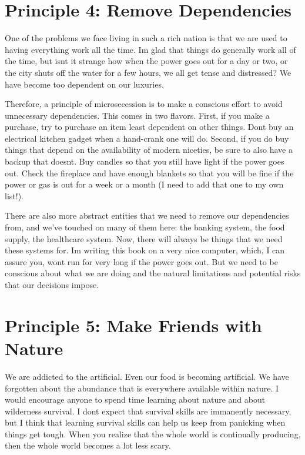 \section{Principle 4: Remove
Dependencies}

One of the problems we face living in such a rich nation is that we are
used to having everything work all the time. I{\textquotesingle}m glad
that things do generally work all of the time, but
isn{\textquotesingle}t it strange how when the power goes out for a day
or two, or the city shuts off the water for a few hours, we all get
tense and distressed? We have become too dependent on our luxuries.


Therefore, a principle of microsecession is to make a conscious effort
to avoid unnecessary dependencies. This comes in two flavors. First, if
you make a purchase, try to purchase an item least dependent on other
things. Don{\textquotesingle}t buy an electrical kitchen gadget when a
hand-crank one will do. Second, if you do buy things that depend on the
availability of modern niceties, be sure to also have a backup that
doesn{\textquotesingle}t. Buy candles so that you still have light if
the power goes out. Check the fireplace and have enough blankets so
that you will be fine if the power or gas is out for a week or a month
(I need to add that one to my own list!).


There are also more abstract entities that we need to remove our
dependencies from, and
we’ve touched on many of them here: the banking system, the food
supply, the healthcare system. Now, there will always be things that
we need these systems for. I{\textquotesingle}m writing this book on a
very nice computer, which, I can assure you, won{\textquotesingle}t run
for very long if the power goes out. But we need to be conscious about
what we are doing and the natural limitations and potential risks that
our decisions
impose.

\section{Principle 5: Make
Friends with Nature}

We are addicted to the artificial. Even our food is becoming artificial.
We have forgotten about the abundance that is everywhere available
within nature. I would encourage anyone to spend time learning about
nature and about wilderness survival. I don{\textquotesingle}t expect
that survival skills are immanently necessary, but I think that
learning survival skills can help us
keep from panicking
when things get tough. When you realize that the whole world is
continually producing, then the whole world becomes a lot less scary.


